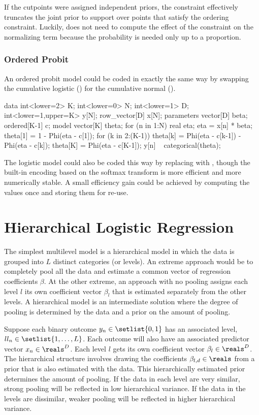 If the cutpoints were assigned independent priors, the constraint
effectively truncates the joint prior to support over points that
satisfy the ordering constraint.  Luckily, \Stan does not need to
compute the effect of the constraint on the normalizing term because
the probability is needed only up to a proportion.


\subsubsection{Ordered Probit}

An ordered probit model could be coded in exactly the same way by
swapping the cumulative logistic () for the cumulative
normal ().
%

\begin{stancode}
data {
  int<lower=2> K;
  int<lower=0> N;
  int<lower=1> D;
  int<lower=1,upper=K> y[N];
  row_vector[D] x[N];
}
parameters {
  vector[D] beta;
  ordered[K-1] c;
}
model {
  vector[K] theta;
  for (n in 1:N) {
    real eta;
    eta = x[n] * beta;
    theta[1] = 1 - Phi(eta - c[1]);
    for (k in 2:(K-1))
      theta[k] = Phi(eta - c[k-1]) - Phi(eta - c[k]);
    theta[K] = Phi(eta - c[K-1]);
    y[n] ~ categorical(theta);
  }
}
\end{stancode}
%
The logistic model could also be coded this way by replacing
 with , though the built-in encoding based
on the softmax transform is more efficient and more numerically
stable.  A small efficiency gain could be achieved by computing the
values  once and storing them for re-use.


\section{Hierarchical Logistic Regression}

The simplest multilevel model is a hierarchical model in which the
data is grouped into $L$ distinct categories (or levels).  An extreme
approach would be to completely pool all the data and estimate a
common vector of regression coefficients $\beta$.  At the other
extreme, an approach with no pooling assigns each level $l$ its own
coefficient vector $\beta_l$ that is estimated separately from the
other levels.  A hierarchical model is an intermediate solution where
the degree of pooling is determined by the data and a prior on the
amount of pooling.

Suppose each binary outcome $y_n \in \setlist{0,1}$ has an associated
level, $ll_n \in \setlist{1,\ldots,L}$.  Each outcome will also have
an associated predictor vector $x_n \in \reals^D$.  Each level $l$
gets its own coefficient vector $\beta_l \in \reals^D$.  The
hierarchical structure involves drawing the coefficients $\beta_{l,d}
\in \reals$ from a prior that is also estimated with the data.  This
hierarchically estimated prior determines the amount of pooling.  If
the data in each level are very similar, strong pooling will be
reflected in low hierarchical variance.  If the data in the levels are
dissimilar, weaker pooling will be reflected in higher hierarchical variance.

